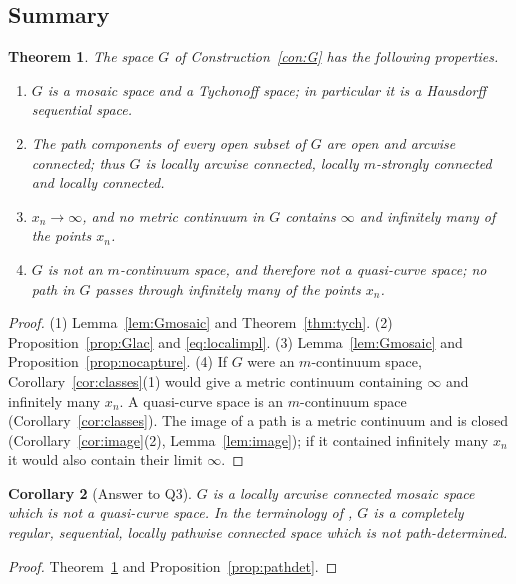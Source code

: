 \documentclass[11pt]{amsart}
\newtheorem{theorem}{Theorem}[section]
\newtheorem{corollary}[theorem]{Corollary}
\theoremstyle{definition}
\theoremstyle{remark}
\numberwithin{equation}{section}
\begin{document}
\subsection{Summary}
\begin{theorem}\label{thm:G}
The space $G$ of Construction~\ref{con:G} has the following properties.
\begin{enumerate}[label=\textup{(\arabic*)}]
\item $G$ is a mosaic space and a Tychonoff space; in particular it is a Hausdorff sequential space.
\item The path components of every open subset of $G$ are open and arcwise connected; thus $G$ is locally arcwise connected, locally $m$-strongly connected and locally connected.
\item $x_n\to\infty$, and no metric continuum in $G$ contains $\infty$ and infinitely many of the points $x_n$.
\item $G$ is not an $m$-continuum space, and therefore not a quasi-curve space; no path in $G$ passes through infinitely many of the points $x_n$.
\end{enumerate}
\end{theorem}
\begin{proof}
(1) Lemma~\ref{lem:Gmosaic} and Theorem~\ref{thm:tych}. (2) Proposition~\ref{prop:Glac} and \eqref{eq:localimpl}. (3) Lemma~\ref{lem:Gmosaic} and Proposition~\ref{prop:nocapture}. (4) If $G$ were an $m$-continuum space, Corollary~\ref{cor:classes}(1) would give a metric continuum containing $\infty$ and infinitely many $x_n$. A quasi-curve space is an $m$-continuum space (Corollary~\ref{cor:classes}). The image of a path is a metric continuum and is closed (Corollary~\ref{cor:image}(2), Lemma~\ref{lem:image}); if it contained infinitely many $x_n$ it would also contain their limit $\infty$.
\end{proof}

\begin{corollary}[Answer to Q3]\label{cor:Q3}
$G$ is a locally arcwise connected mosaic space which is not a quasi-curve space. In the terminology of \cite{vandouwen81}, $G$ is a completely regular, sequential, locally pathwise connected space which is not path-determined.
\end{corollary}
\begin{proof}
Theorem~\ref{thm:G} and Proposition~\ref{prop:pathdet}.
\end{proof}
\end{document}
